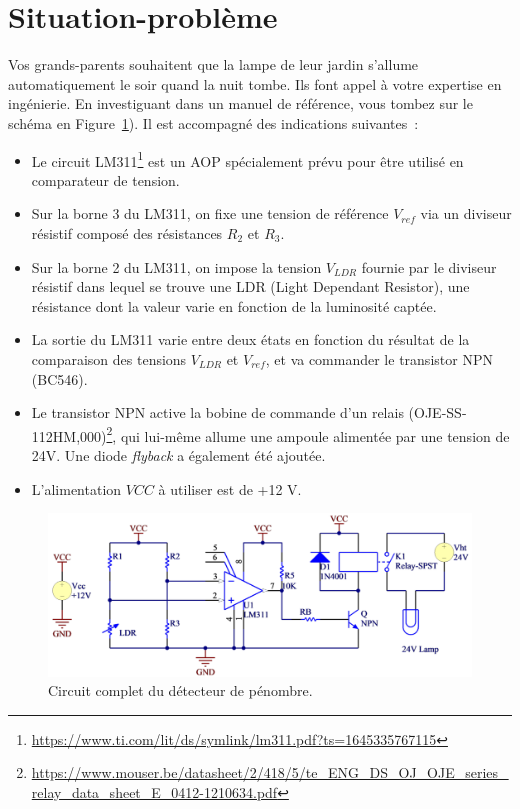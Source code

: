 \documentclass{../../template/labo}
\begin{document}
\section{Situation-problème}
Vos grands-parents souhaitent que la lampe de leur jardin s’allume automatiquement le soir
quand la nuit tombe. Ils font appel à votre expertise en ingénierie. 
En investiguant dans un manuel de référence, vous tombez sur le schéma en Figure~\ref{fig:montage-complet}).
Il est accompagné des indications suivantes~:
\begin{itemize}
	\item  Le circuit LM311\footnote{\url{https://www.ti.com/lit/ds/symlink/lm311.pdf?ts=1645335767115}} est un AOP spécialement prévu pour être utilisé en comparateur de tension.
	\item  Sur la borne 3 du LM311, on fixe une tension de référence $V_{ref}$ via un diviseur résistif composé des résistances $R_2$ et $R_3$.
	\item Sur la borne 2 du LM311, on impose la tension $V_{LDR}$ fournie par le diviseur résistif dans lequel se trouve une LDR (Light Dependant Resistor), une résistance dont la valeur varie en fonction de la luminosité captée.
	\item La sortie du LM311 varie entre deux états en fonction du résultat de la comparaison
des tensions $V_{LDR}$ et $V_{ref}$, et va commander le transistor NPN (BC546).
	\item Le transistor NPN active la bobine de commande d'un relais (OJE-SS-112HM,000)\footnote{\url{https://www.mouser.be/datasheet/2/418/5/te_ENG_DS_OJ_OJE_series_relay_data_sheet_E_0412-1210634.pdf}}, qui lui-même allume une ampoule alimentée par une tension de 24V. Une diode \textit{flyback} a également été ajoutée.
	\item L'alimentation $VCC$ à utiliser est de +12 V.
\end{itemize}

\begin{figure}[ht]
\centering
\includegraphics[width=\textwidth]{montage-complet.png}
\caption{Circuit complet du détecteur de pénombre.}
\label{fig:montage-complet}
\end{figure}
\end{document}
